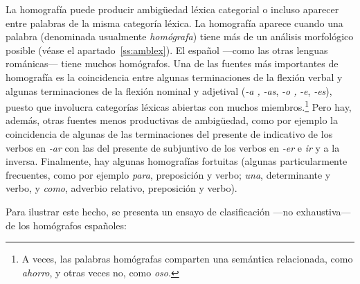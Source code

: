 La homografía puede producir ambigüedad léxica categorial o incluso aparecer entre palabras de la misma categoría léxica. La homografía aparece cuando una palabra (denominada usualmente \emph{homógrafa}) tiene más de un análisis morfológico posible (véase el apartado~\ref{ss:amblex}). El español ---como las otras lenguas románicas--- tiene muchos homógrafos. Una de las fuentes más importantes de homografía es la coincidencia entre algunas terminaciones de la flexión verbal y algunas terminaciones de la flexión nominal y adjetival (\emph{-a ,} \emph{-as}, \emph{-o ,} \emph{-e}, \emph{-es}), puesto que involucra categorías léxicas abiertas con muchos miembros.\footnote{A veces, las palabras homógrafas comparten una semántica relacionada, como \emph{ahorro}, y otras veces no, como \emph{oso}.} Pero hay, además, otras fuentes menos productivas de ambigüedad, como por ejemplo la coincidencia de algunas de las terminaciones del presente de indicativo de los verbos en \emph{-ar} con las del presente de subjuntivo de los verbos en \emph{-er} e \emph{ir} y a la inversa. Finalmente, hay algunas homografías fortuitas (algunas particularmente frecuentes, como por ejemplo \emph{para}, preposición y verbo; \emph{una}, determinante y verbo, y \emph{como}, adverbio relativo, preposición y verbo). 

Para ilustrar este hecho, se presenta un ensayo de clasificación ---no exhaustiva--- de los homógrafos españoles: 

